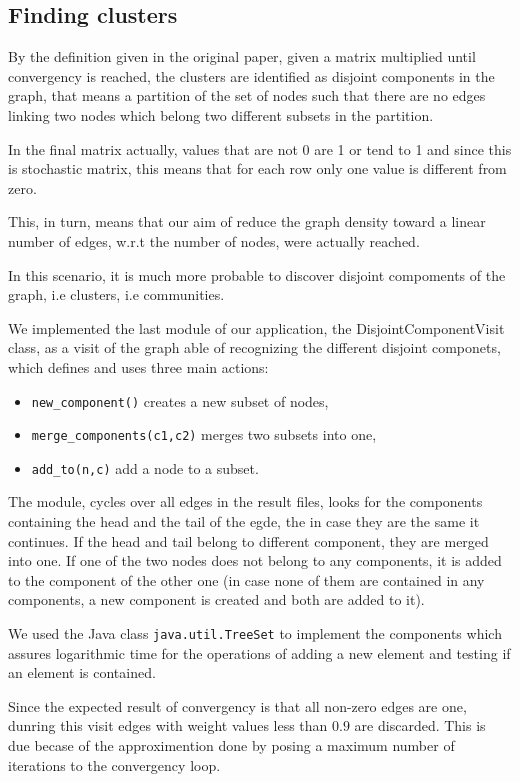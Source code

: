 \subsection{Finding clusters}
By the definition given in the original paper, given a matrix
multiplied until convergency is reached, the clusters are
identified as disjoint components in the graph, that means
a partition of the set of nodes such that there are no edges
linking two nodes which belong two different subsets in the partition.

In the  final matrix actually, values that are not 0 are 1 or tend to 1
and since this is stochastic matrix, this means that for each row
only one value is different from zero.

This, in turn, means that our aim of reduce the graph density toward
a linear number of edges, w.r.t the number of nodes, were  actually reached.

In this scenario, it is much more probable to discover disjoint compoments
of the graph, i.e clusters, i.e communities.

We implemented the last module of our application, the DisjointComponentVisit
class, as a visit
of the graph able of recognizing the different disjoint componets, which
defines and uses three main actions:
\begin{itemize}
    \item \verb!new_component()! creates a new subset of nodes,
    \item \verb!merge_components(c1,c2)! merges two subsets into one,
    \item \verb!add_to(n,c)! add a node to a subset.
\end{itemize}

The module, cycles over all edges in the result files, looks
for the components containing the head and the tail of the egde,
the in case they are the same it continues. If the head and tail
belong to different component, they are merged into one.
If one of the two nodes does not belong to any components, it is
added  to the component of the other one (in case none of them 
are contained in any components, a new component is created and both
are added to it).

We used the Java class \verb!java.util.TreeSet! to implement
the components which assures logarithmic time for
the operations of adding a new element and testing if an element
is contained. 

Since the expected result of convergency is that all non-zero edges
are one, dunring this visit edges with weight values less than $0.9$
are discarded. This is due becase of the approximention done by
posing a maximum number of iterations to the convergency loop.

